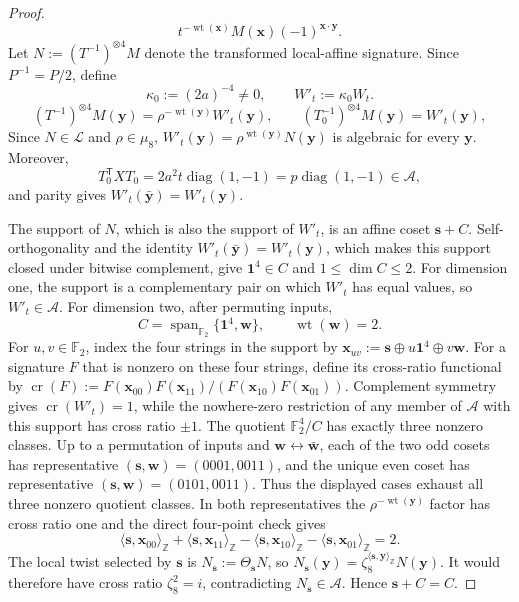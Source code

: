 \documentclass[11pt,letterpaper,onecolumn]{article}
\theoremstyle{plain}
\theoremstyle{definition}
\theoremstyle{remark}
\newcommand{\Ftwo}{\mathbb F_2}
\newcommand{\cA}{\mathscr A}
\newcommand{\cL}{\mathscr L}
\newcommand{\diag}{\operatorname{diag}}
\newcommand{\Span}{\operatorname{span}}
\newcommand{\wt}{\operatorname{wt}}
\newcommand{\one}{\mathbf 1}
\begin{document}
\begin{proof}
\[  t^{-\wt({\mathbf{x}})}M({\mathbf{x}})(-1)^{{\mathbf{x}}\cdot {\mathbf{y}}}.
\]
Let \(N:=(T^{-1})^{\otimes4}M\) denote the transformed local-affine
signature.  Since \(P^{-1}=P/2\), define
\[
  \kappa_0:=(2a)^{-4}\ne0,
  \qquad
  W'_t:=\kappa_0W_t.
\]
\begin{equation}
  (T^{-1})^{\otimes4}M({\mathbf{y}})=\rho^{-\wt({\mathbf{y}})}W'_t({\mathbf{y}}),
  \qquad
  (T_0^{-1})^{\otimes4}M({\mathbf{y}})=W'_t({\mathbf{y}}),
  \label{eq:p1-eight-vertex-local-affine-delete}
\end{equation}
Since \(N\in\cL\) and \(\rho\in\mu_8\),
\(W'_t({\mathbf{y}})=\rho^{\wt({\mathbf{y}})}N({\mathbf{y}})\) is algebraic for every \({\mathbf{y}}\).
Moreover,
\[
  T_0^{\mathsf T}XT_0
  =2a^2t\diag(1,-1)
  =p\diag(1,-1)\in\cA,
\]
and parity gives \(W'_t(\bar {\mathbf{y}})=W'_t({\mathbf{y}})\).

The support of \(N\), which is also the support of
\(W'_t\), is an affine coset \({\mathbf{s}}+C\).  Self-orthogonality and the
identity \(W'_t(\bar {\mathbf{y}})=W'_t({\mathbf{y}})\), which makes this support
closed under bitwise complement, give
\(\one^4\in C\) and \(1\le\dim C\le2\).  For dimension one, the support is
a complementary pair on which \(W'_t\) has equal values, so
\(W'_t\in\cA\).
For dimension two, after permuting inputs,
\[
  C=\Span_{\Ftwo}\{\one^4,{\mathbf{w}}\},
  \qquad \wt({\mathbf{w}})=2.
\]
For \(u,v\in\Ftwo\), index the four strings in the support by
\({\mathbf{x}}_{uv}:={\mathbf{s}}\oplus u\one^4\oplus v{\mathbf{w}}\).  For a signature \(F\) that is nonzero on
these four strings, define its cross-ratio functional by
\(\operatorname{cr}(F):=F({\mathbf{x}}_{00})F({\mathbf{x}}_{11})/
(F({\mathbf{x}}_{10})F({\mathbf{x}}_{01}))\).  Complement symmetry gives
\(\operatorname{cr}(W'_t)=1\), while the nowhere-zero restriction of
any member of \(\cA\) with this support has cross ratio \(\pm1\).  The
quotient \(\Ftwo^4/C\) has exactly three nonzero classes.  Up to a permutation of inputs and \({\mathbf{w}}\leftrightarrow\bar {\mathbf{w}}\), each of the two odd cosets has
representative \(({\mathbf{s}},{\mathbf{w}})=(0001,0011)\), and the unique even coset has
representative \(({\mathbf{s}},{\mathbf{w}})=(0101,0011)\).  Thus the displayed cases exhaust
all three nonzero quotient classes.  In both representatives
the \(\rho^{-\wt({\mathbf{y}})}\) factor has cross ratio one and the direct four-point
check gives
\[
 \langle {\mathbf{s}},{\mathbf{x}}_{00}\rangle_{\mathbb Z}
 +\langle {\mathbf{s}},{\mathbf{x}}_{11}\rangle_{\mathbb Z}
 -\langle {\mathbf{s}},{\mathbf{x}}_{10}\rangle_{\mathbb Z}
 -\langle {\mathbf{s}},{\mathbf{x}}_{01}\rangle_{\mathbb Z}=2.
\]
The local twist selected by \({\mathbf{s}}\) is \(N_{\mathbf{s}}:=\Theta_{\mathbf{s}}N\), so
\(N_{\mathbf{s}}({\mathbf{y}})=\zeta_8^{\langle {\mathbf{s}},{\mathbf{y}}\rangle_{\mathbb Z}}N({\mathbf{y}})\).  It would therefore
have cross ratio \(\zeta_8^2=i\), contradicting \(N_{\mathbf{s}}\in\cA\).  Hence
\({\mathbf{s}}+C=C\).


\end{proof}
\end{document}
